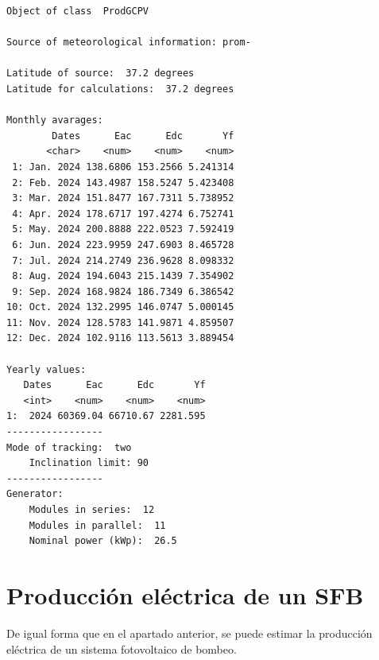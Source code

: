 \begin{verbatim}
Object of class  ProdGCPV 

Source of meteorological information: prom- 

Latitude of source:  37.2 degrees
Latitude for calculations:  37.2 degrees

Monthly avarages:
        Dates      Eac      Edc       Yf
       <char>    <num>    <num>    <num>
 1: Jan. 2024 138.6806 153.2566 5.241314
 2: Feb. 2024 143.4987 158.5247 5.423408
 3: Mar. 2024 151.8477 167.7311 5.738952
 4: Apr. 2024 178.6717 197.4274 6.752741
 5: May. 2024 200.8888 222.0523 7.592419
 6: Jun. 2024 223.9959 247.6903 8.465728
 7: Jul. 2024 214.2749 236.9628 8.098332
 8: Aug. 2024 194.6043 215.1439 7.354902
 9: Sep. 2024 168.9824 186.7349 6.386542
10: Oct. 2024 132.2995 146.0747 5.000145
11: Nov. 2024 128.5783 141.9871 4.859507
12: Dec. 2024 102.9116 113.5613 3.889454

Yearly values:
   Dates      Eac      Edc       Yf
   <int>    <num>    <num>    <num>
1:  2024 60369.04 66710.67 2281.595
-----------------
Mode of tracking:  two 
    Inclination limit: 90 
-----------------
Generator:
    Modules in series:  12 
    Modules in parallel:  11 
    Nominal power (kWp):  26.5
\end{verbatim}

\section{Producción eléctrica de un SFB}
\label{sec:org6a7978f}
De igual forma que en el apartado anterior, se puede estimar la producción eléctrica de un sistema fotovoltaico de bombeo.

